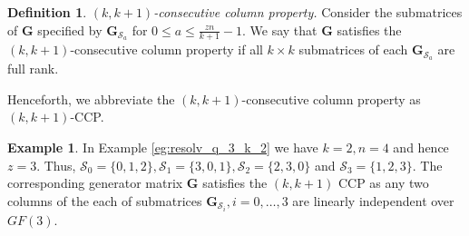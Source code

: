 \documentclass[journal,twocolumn]{IEEEtran}
\theoremstyle{definition}
\newtheorem{example}{Example}
\newtheorem{definition}{Definition}
\newcommand{\calS}{\mathcal{S}}
\newcommand{\bfG}{\mathbf{G}}
\begin{document}
\begin{definition}{\it $(k,k+1)$-consecutive column property.}
\label{def:MDSproperty}
Consider the submatrices of $\bfG$ specified by  $\bfG_{\calS_a}$ for $0\le a\le \frac{zn}{k+1}-1$. We say that $\bfG$ satisfies the $(k,k+1)$-consecutive column property if all $k \times k$ submatrices of each $\bfG_{\calS_a}$ are full rank.
\end{definition}
Henceforth, we abbreviate the $(k,k+1)$-consecutive column property as $(k,k+1)$-CCP.%
\begin{example}
\label{eg:code_k=2_n=4}
In Example \ref{eg:resolv_q_3_k_2} we have $k=2, n=4$ and hence $z=3$. Thus, $\calS_0 = \{0,1,2\}, \calS_1 = \{3,0,1\}, \calS_2 = \{2, 3, 0\}$ and $\calS_3 = \{1,2,3\}$.
The corresponding generator matrix $\bfG$ satisfies the $(k,k+1)$ CCP as any two columns of the each of submatrices $\bfG_{\calS_i}, i = 0, \dots, 3$ are linearly independent over $GF(3)$.
\end{example}
\end{document}
